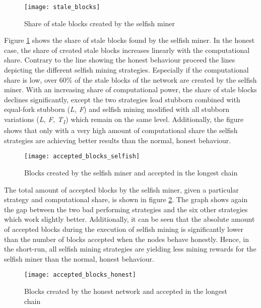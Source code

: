 \begin{figure}[t]
\texttt{[image: stale\_blocks]}
\centering
\caption{Share of stale blocks created by the selfish miner}
\label{fig:stale_blocks}
\end{figure}

Figure \ref{fig:stale_blocks} shows the share of stale blocks found by the selfish miner.
In the honest case, the share of created stale blocks increases linearly with the computational share.
Contrary to the line showing the honest behaviour proceed the lines depicting the different selfish mining strategies.
Especially if the computational share is low, over 60\% of the stale blocks of the network are created by the selfish miner.
With an increasing share of computational power, the share of stale blocks declines significantly, except the two strategies lead stubborn combined with equal-fork stubborn (\textit{L, F}) and selfish mining modified with all stubborn variations (\textit{L, F, T\textsubscript{1}}) which remain on the same level.
Additionally, the figure shows that only with a very high amount of computational share the selfish strategies are achieving better results than the normal, honest behaviour.

\begin{figure}[t]
\texttt{[image: accepted\_blocks\_selfish]}
\centering
\caption{Blocks created by the selfish miner and accepted in the longest chain}
\label{fig:accepted_blocks_selfish}
\end{figure}

The total amount of accepted blocks by the selfish miner, given a particular strategy and computational share, is shown in figure \ref{fig:accepted_blocks_selfish}.
The graph shows again the gap between the two bad performing strategies and the six other strategies which work slightly better.
Additionally, it can be seen that the absolute amount of accepted blocks during the execution of selfish mining is significantly lower than the number of blocks accepted when the nodes behave honestly.
Hence, in the short-run, all selfish mining strategies are yielding less mining rewards for the selfish miner than the normal, honest behaviour.

\begin{figure}[t]
\texttt{[image: accepted\_blocks\_honest]}
\centering
\caption{Blocks created by the honest network and accepted in the longest chain}
\label{fig:accepted_blocks_honest}
\end{figure}

